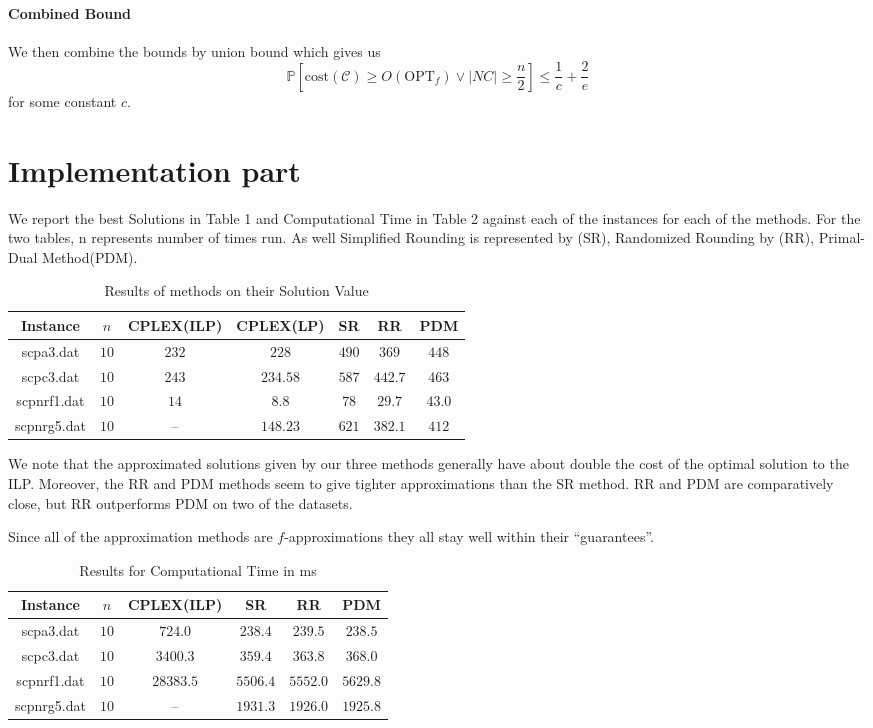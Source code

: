 \documentclass[11pt,a4paper,english]{article}
\newcommand{\PP}{\mathbb{P}}      %
\begin{document}
\paragraph{Combined Bound}
We then combine the bounds by union bound which gives us
$$\PP\left[\mathrm{cost}(\mathcal{C}) \geq O(\mathrm{OPT}_f) \vee  |NC| \geq \frac{n}{2} \right]
\leq \frac{1}{c} + \frac{2}{e}$$
for some constant $c$.

\clearpage


\section{Implementation part}

We report the best Solutions in Table 1 and Computational Time in Table 2 against each of the instances for each of the methods. For the two tables, n represents number of times run. As well Simplified Rounding is represented by (SR), Randomized Rounding by (RR), Primal-Dual Method(PDM).

\begin{table}[h!]
  \centering
  \begin{tabular}{|c|c|c|c|c|c|c|}\hline
    Instance& $n$& CPLEX(ILP)&CPLEX(LP)&SR&RR&PDM  \\\hline
    scpa3.dat &$10$&$232$ & $228$ & $490$& $369$ & $448$  \\
    scpc3.dat &$10$&$243$ & $234.58$ & $587$& $442.7$ & $463$ \\
    scpnrf1.dat &$10$&$14$ & $8.8$ & $78$& $29.7$ & $43.0$  \\
    scpnrg5.dat &$10$&-- & $148.23$ & $621$& $382.1$ & $412$  \\\hline
  \end{tabular}
  \caption{Results of methods on their Solution Value}
  \label{tab:res}
\end{table}

We note that the approximated solutions given by our three methods generally have about double the cost of the optimal solution to the ILP.
Moreover, the RR and PDM methods seem to give tighter approximations than the SR method. RR and PDM are comparatively close, but RR outperforms PDM
on two of the datasets.

Since all of the approximation methods are $f$-approximations \citep[pp. 118-131]{Vaz} they all stay well within their ``guarantees''.

\begin{table}[h!]
  \centering
  \begin{tabular}{|c|c|c|c|c|c|}\hline
    Instance& $n$& CPLEX(ILP)&SR&RR&PDM \\\hline
    scpa3.dat &$10$&$724.0$ & $238.4$& $239.5$ & $238.5$  \\
    scpc3.dat &$10$ & $3400.3$ & $359.4$& $363.8$ & $368.0$ \\
    scpnrf1.dat	 &$10$ & $28383.5$ & $5506.4$& $5552.0$ & $5629.8$  \\
    scpnrg5.dat &$10$ & -- & $1931.3$& $1926.0$ & $1925.8$  \\\hline
  \end{tabular}
  \caption{Results for Computational Time in ms}
  \label{tab:time}
\end{table}
\end{document}
